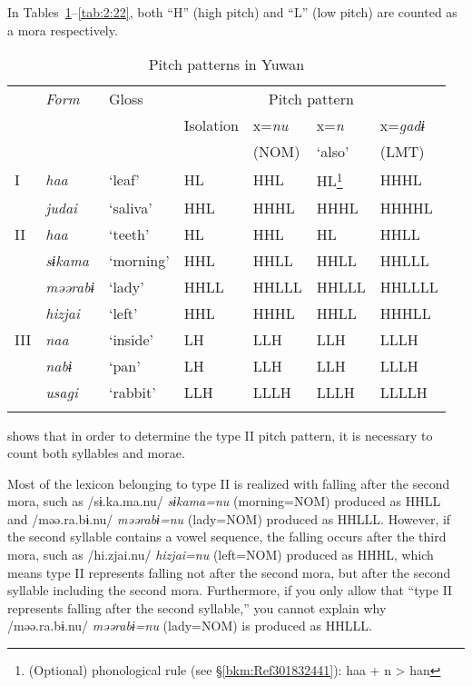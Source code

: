 In Tables~\ref{tab:2:20}--\ref{tab:2:22}, both “H” (high pitch) and “L” (low pitch) are counted as a mora respectively.

\begin{table}
\caption{Pitch patterns in Yuwan\label{tab:2:20}}
\begin{tabular}{ l >{\itshape}l *{5}{l} }  
\lsptoprule
&  \normalfont Form & Gloss & \multicolumn{4}{c}{Pitch pattern}\\\cmidrule(lr){4-7} 
     &                     & & Isolation &  x=\textit{nu} &  x=\textit{n} &  x=\textit{gadɨ}\\
     &                     & &          &   (NOM) &  ‘also’ &  (LMT)\\\midrule
I & \itshape haa &  ‘leaf’ &  HL &  HHL &  HL\footnote{(Optional) phonological rule (see §\ref{bkm:Ref301832441}): haa + n > han} &  HHHL\\
  & judai &  ‘saliva’ &  HHL &  HHHL &  HHHL &  HHHHL\\
II & \itshape haa &  ‘teeth’ &  HL &  HHL &  HL &  HHLL\\
  & sɨkama &  ‘morning’ &  HHL &  HHLL &  HHLL &  HHLLL\\
  & məərabɨ &  ‘lady’ &  HHLL &  HHLLL &  HHLLL &  HHLLLL\\
  & hizjai &  ‘left’ &  HHL &  HHHL &  HHLL &  HHHLL\\
III & \itshape naa &  ‘inside’ &  LH &  LLH &  LLH &  LLLH\\
  & nabɨ &  ‘pan’ &  LH &  LLH &  LLH &  LLLH\\
  & usagi &  ‘rabbit’ &  LLH &  LLLH &  LLLH &  LLLLH\\
\lspbottomrule
\end{tabular}
\end{table}

 shows that in order to determine the type II pitch pattern, it is necessary to count both syllables and morae.

Most of the lexicon belonging to type II is realized with falling after the second mora, such as /sɨ.ka.ma.nu/ \textit{sɨkama=nu} (morning=NOM) produced as HHLL and /məə.ra.bɨ.nu/ \textit{məərabɨ=nu} (lady=NOM) produced as HHLLL. However, if the second syllable contains a vowel sequence, the falling occurs after the third mora, such as /hi.zjai.nu/ \textit{hizjai=nu} (left=NOM) produced as HHHL, which means type II represents falling not after the second mora, but after the second syllable including the second mora. Furthermore, if you only allow that “type II represents falling after the second syllable,” you cannot explain why /məə.ra.bɨ.nu/ \textit{məərabɨ=nu} (lady=NOM) is produced as HHLLL.


